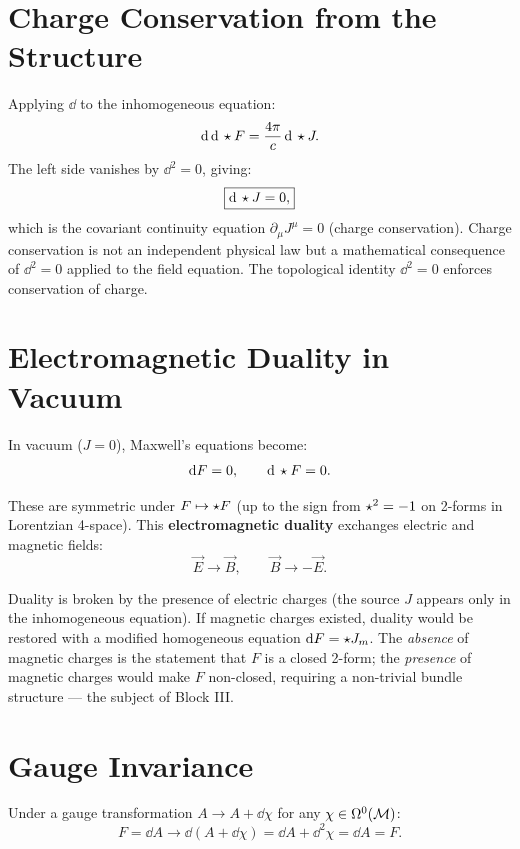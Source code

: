 \section{Charge Conservation from the Structure}

Applying $\dd$ to the inhomogeneous equation:
\begin{equation}
\mathrm{d}\,\mathrm{d}\,\star F = \frac{4\pi}{c}\,\mathrm{d}\,\star J.
\end{equation}
The left side vanishes by $\dd^2 = 0$, giving:
\begin{equation}
\boxed{\mathrm{d}\,\star J = 0,}
\end{equation}
which is the covariant continuity equation $\partial_\mu J^\mu = 0$ (charge conservation). Charge conservation is not an independent physical law but a mathematical consequence of $\dd^2 = 0$ applied to the field equation. The topological identity $\dd^2 = 0$ enforces conservation of charge.

\section{Electromagnetic Duality in Vacuum}

In vacuum ($J = 0$), Maxwell's equations become:
\begin{equation}
\mathrm{d} F = 0, \qquad \mathrm{d}\,\star F = 0.
\end{equation}

These are symmetric under $F \mapsto \star F$ (up to the sign from $\star^2 = -1$ on 2-forms in Lorentzian 4-space). This \textbf{electromagnetic duality} exchanges electric and magnetic fields:
\begin{equation}
\vec{E} \to \vec{B}, \qquad \vec{B} \to -\vec{E}.
\end{equation}

Duality is broken by the presence of electric charges (the source $J$ appears only in the inhomogeneous equation). If magnetic charges existed, duality would be restored with a modified homogeneous equation $\mathrm{d} F = \star J_m$. The \emph{absence} of magnetic charges is the statement that $F$ is a closed 2-form; the \emph{presence} of magnetic charges would make $F$ non-closed, requiring a non-trivial bundle structure --- the subject of Block III.

\section{Gauge Invariance}

Under a gauge transformation $A \to A + \dd\chi$ for any $\chi \in \Omega^0(\mathcal{M})$:
\begin{equation}
F = \dd A \to \dd(A + \dd\chi) = \dd A + \dd^2\chi = \dd A = F.
\end{equation}

